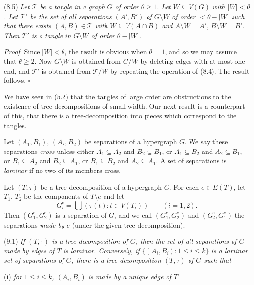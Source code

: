 \stmt
(8.5) \textit{Let $\mathscr{T}$ be a tangle in a graph $G$ of order $\theta \ge 1$. Let $W \subseteq V(G)$ with $|W| < \theta$. Let $\mathscr{T}'$ be the set of all separations $(A', B')$ of $G \setminus W$ of order $< \theta - |W|$ such that there exists $(A, B) \in \mathscr{T}$ with $W \subseteq V(A \cap B)$ and $A \setminus W = A'$, $B \setminus W = B'$. Then $\mathscr{T}'$ is a tangle in $G \setminus W$ of order $\theta - |W|$.}

\textit{Proof.} Since $|W| < \theta$, the result is obvious when $\theta = 1$, and so we may assume that $\theta \ge 2$. Now $G \setminus W$ is obtained from $G/W$ by deleting edges with at most one end, and $\mathscr{T}'$ is obtained from $\mathscr{T}/W$ by repeating the operation of (8.4). The result follows. $\square$


We have seen in (5.2) that the tangles of large order are obstructions to the existence of tree-decompositions of small width. Our next result is a counterpart of this, that there is a tree-decomposition into pieces which correspond to the tangles.

Let $(A_1, B_1)$, $(A_2, B_2)$ be separations of a hypergraph $G$. We say these separations \textit{cross} unless either $A_1 \subseteq A_2$ and $B_2 \subseteq B_1$, or $A_1 \subseteq B_2$ and $A_2 \subseteq B_1$, or $B_1 \subseteq A_2$ and $B_2 \subseteq A_1$, or $B_1 \subseteq B_2$ and $A_2 \subseteq A_1$. A set of separations is \textit{laminar} if no two of its members cross.

Let $(T, \tau)$ be a tree-decomposition of a hypergraph $G$. For each $e \in E(T)$, let $T_1$, $T_2$ be the components of $T \setminus e$ and let
\begin{equation*}
G_i^e = \bigcup (\tau(t) : t \in V(T_i)) \qquad (i = 1, 2).
\end{equation*}
Then $(G_1^e, G_2^e)$ is a separation of $G$, and we call $(G_1^e, G_2^e)$ and $(G_2^e, G_1^e)$ the separations \textit{made by} $e$ (under the given tree-decomposition).

\stmt
(9.1) \textit{If $(T, \tau)$ is a tree-decomposition of $G$, then the set of all separations of $G$ made by edges of $T$ is laminar. Conversely, if $\{(A_i, B_i) : 1 \le i \le k\}$ is a laminar set of separations of $G$, there is a tree-decomposition $(T, \tau)$ of $G$ such that}

\hspace*{12pt}(i) \textit{for $1 \le i \le k$, $(A_i, B_i)$ is made by a unique edge of $T$}

